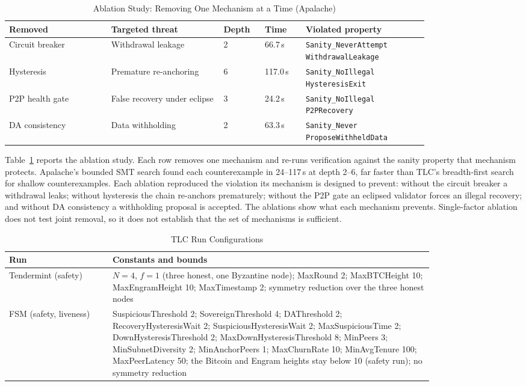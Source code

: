 \begin{table}[h]
\caption{Ablation Study: Removing One Mechanism at a Time (Apalache)}
\label{tab:ablation}
\centering
\footnotesize
\begin{tabular}{@{}p{0.2\linewidth}p{0.22\linewidth}p{0.07\linewidth}p{0.08\linewidth}p{0.24\linewidth}@{}}
\toprule
\textbf{Removed} & \textbf{Targeted threat} & \textbf{Depth} & \textbf{Time} & \textbf{Violated property} \\
\midrule
Circuit breaker & Withdrawal leakage & 2 & 66.7\,s & \texttt{Sanity\_NeverAttempt} \texttt{WithdrawalLeakage} \\
Hysteresis & Premature re-anchoring & 6 & 117.0\,s & \texttt{Sanity\_NoIllegal} \texttt{HysteresisExit} \\
P2P health gate & False recovery under eclipse & 3 & 24.2\,s & \texttt{Sanity\_NoIllegal} \texttt{P2PRecovery} \\
DA consistency & Data withholding & 2 & 63.3\,s & \texttt{Sanity\_Never} \texttt{ProposeWithheldData} \\
\bottomrule
\end{tabular}
\end{table}

Table~\ref{tab:ablation} reports the ablation study. Each row removes one
mechanism and re-runs verification against the sanity property that
mechanism protects. Apalache's bounded SMT search found each counterexample
in 24--117\,s at depth 2--6, far faster than TLC's breadth-first search for
shallow counterexamples. Each ablation reproduced the violation its mechanism
is designed to prevent: without the circuit breaker a withdrawal leaks;
without hysteresis the chain re-anchors prematurely; without the P2P gate an
eclipsed validator forces an illegal recovery; and without DA consistency a
withholding proposal is accepted. The ablations show what each mechanism
prevents. Single-factor ablation does not test joint removal, so it does not
establish that the set of mechanisms is sufficient.

\begin{table}[h]
\caption{TLC Run Configurations}
\label{tab:formal-config}
\centering
\footnotesize
\begin{tabular}{@{}p{0.2\linewidth}p{0.62\linewidth}@{}}
\toprule
\textbf{Run} & \textbf{Constants and bounds} \\
\midrule
Tendermint (safety) & $N{=}4$, $f{=}1$ (three honest, one Byzantine node); MaxRound 2; MaxBTCHeight 10; MaxEngramHeight 10; MaxTimestamp 2; symmetry reduction over the three honest nodes \\
FSM (safety, liveness) & SuspiciousThreshold 2; SovereignThreshold 4; DAThreshold 2; RecoveryHysteresisWait 2; SuspiciousHysteresisWait 2; MaxSuspiciousTime 2; DownHysteresisThreshold 2; MaxDownHysteresisThreshold 8; MinPeers 3; MinSubnetDiversity 2; MinAnchorPeers 1; MaxChurnRate 10; MinAvgTenure 100; MaxPeerLatency 50; the Bitcoin and Engram heights stay below 10 (safety run); no symmetry reduction \\
\bottomrule
\end{tabular}
\end{table}

